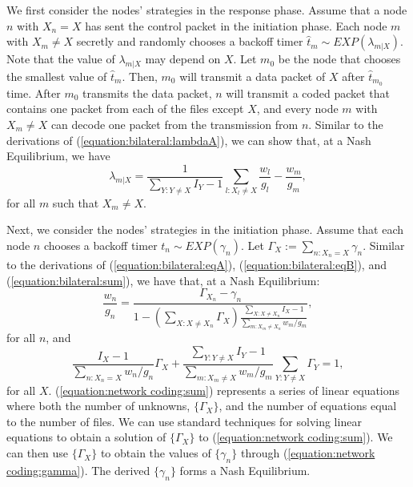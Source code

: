 \documentclass[11pt, conference]{IEEEtran}
\begin{document}
We first consider the nodes' strategies in the response phase. Assume that a node $n$ with $X_n=X$ has sent the control packet in the initiation phase. Each node $m$ with $X_m\neq X$ secretly and randomly chooses a backoff timer $\hat{t}_m\sim EXP(\lambda_{m|X})$. Note that the value of $\lambda_{m|X}$ may depend on $X$. Let $m_0$ be the node that chooses the smallest value of $\hat{t}_m$. Then, $m_0$ will transmit a data packet of $X$ after $\hat{t}_{m_0}$ time. After $m_0$ transmits the data packet, $n$ will transmit a coded packet that contains one packet from each of the files except $X$, and every node $m$ with $X_m\neq X$ can decode one packet from the transmission from $n$. Similar to the derivations of (\ref{equation:bilateral:lambdaA}), we can show that, at a Nash Equilibrium, we have
\begin{equation}
\lambda_{m|X}=\frac{1}{\sum_{Y:Y\neq X}I_Y-1}\sum_{l:X_l\neq X}\frac{w_{l}}{g_l}-\frac{w_m}{g_m},
\end{equation}
for all $m$ such that $X_m\neq X$.

Next, we consider the nodes' strategies in the initiation phase. Assume that each node $n$ chooses a backoff timer $t_n\sim EXP(\gamma_n)$. Let $\Gamma_X:=\sum_{n:X_n=X}\gamma_n$. Similar to the derivations of (\ref{equation:bilateral:eqA}), (\ref{equation:bilateral:eqB}), and (\ref{equation:bilateral:sum}), we have that, at a Nash Equilibrium:
\begin{equation}\label{equation:network coding:gamma}
\frac{w_n}{g_n}=\frac{\Gamma_{X_n}-\gamma_n}{1-(\sum_{X:X\neq X_n}\Gamma_X)\frac{\sum_{X:X\neq X_n}I_X-1}{\sum_{m:X_m\neq X_n}{w_m}/{g_m}}},
\end{equation}
for all $n$, and
\begin{equation}\label{equation:network coding:sum}
\frac{I_X-1}{\sum_{n:X_n=X}w_n/g_n}\Gamma_X+\frac{\sum_{Y:Y\neq X}I_Y-1}{\sum_{m:X_m\neq X}{w_m}/{g_m}}\sum_{Y:Y\neq X}\Gamma_Y=1,
\end{equation}
for all $X$. (\ref{equation:network coding:sum}) represents a series of linear equations where both the number of unknowns, $\{\Gamma_X\}$, and the number of equations equal to the number of files. We can use standard techniques for solving linear equations to obtain a solution of $\{\Gamma_X\}$ to (\ref{equation:network coding:sum}). We can then use $\{\Gamma_X\}$ to obtain the values of $\{\gamma_n\}$ through (\ref{equation:network coding:gamma}). The derived $\{\gamma_n\}$ forms a Nash Equilibrium.
\end{document}
